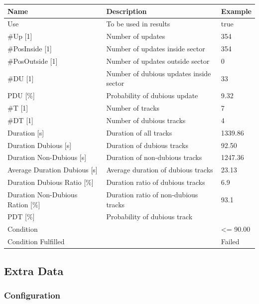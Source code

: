 \begin{center}
 \begin{table}[H]
  \begin{tabularx}{\textwidth}{ | l | X |  l | }
    \hline
    \textbf{Name} & \textbf{Description} & \textbf{Example} \\ \hline
    Use & To be used in results & true \\ \hline
    \#Up [1] & Number of updates & 354 \\ \hline
    \#PosInside [1] & Number of updates inside sector & 354 \\ \hline
    \#PosOutside [1] & Number of updates outside sector & 0 \\ \hline
    \#DU [1] & Number of dubious updates inside sector & 33 \\ \hline
    PDU [\%] & Probability of dubious update & 9.32 \\ \hline
    \#T [1] & Number of tracks & 7 \\ \hline
    \#DT [1] & Number of dubious tracks & 4 \\ \hline
    Duration [s] & Duration of all tracks & 1339.86 \\ \hline
    Duration Dubious [s] & Duration of dubious tracks & 92.50 \\ \hline
    Duration Non-Dubious [s] & Duration of non-dubious tracks & 1247.36 \\ \hline
    Average Duration Dubious [s] & Average duration of dubious tracks & 23.13 \\ \hline
    Duration Dubious Ratio [\%] & Duration ratio of dubious tracks & 6.9 \\ \hline
    Duration Non-Dubious Ration [\%] & Duration ratio of non-dubious tracks & 93.1 \\ \hline
    PDT [\%] & Probability of dubious track &  \\ \hline
    Condition &  & <= 90.00 \\ \hline
    Condition Fulfilled &  & Failed \\ \hline
\end{tabularx}
\end{table}
\end{center}

\subsection{Extra Data}
\label{sec:eval_req_extra_data} 

\subsubsection{Configuration}

